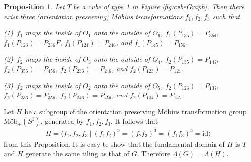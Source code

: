 \documentclass[suppldata, dvipdfmx]{interact}
\theoremstyle{plain}%
\newtheorem{proposition}[theorem]{Proposition}
\theoremstyle{definition}
\theoremstyle{remark}
\theoremstyle{problemstyle}
\begin{document}
\begin{proposition}
Let $T$ be a cube of type 1 in Figure \ref{fig:cubeGraph}. Then there exist three (orientation preserving) M\"obius transformations $f_1, f_2, f_3$ such that \par
(1)\ $f_1$ maps the inside of $O_1$ onto the outside of
     $O_6$, $f_1(P_{135}) = P_{356}$, $f_1(P_{123}) = P_{236}F$,  
$f_1(P_{124}) = P_{246}$, and $f_1(P_{145}) = P_{456}$.\par
(2)\ $f_2$ maps the inside of $O_3$ onto the outside of $O_4$, 
$f_2(P_{135}) = P_{145}$, $f_2(P_{356}) = P_{456}$,  
$f_2(P_{236}) = P_{246}$, and $f_2(P_{123}) = P_{124}$.      \par       
(3)\ $f_2$ maps the inside of $O_2$ onto the outside of $O_5$, 
$f_2(P_{123}) = P_{135}$, $f_2(P_{236}) = P_{356}$,  
$f_2(P_{246}) = P_{456}$, and $f_2(P_{124}) = P_{145}$.             
\end{proposition}

Let $H$ be a subgroup of the orientation preserving M\"obius transformation group M\"ob$_+(S^3)$, 
generated by $f_1, f_2, f_3$. It follows that
\begin{align*}
 H = \langle f_1, f_2, f_3~|~(f_1f_2)^3 = (f_2f_3)^3 = (f_1f_3)^3 = \text{id} \rangle
\end{align*}
from this Proposition.  It is easy to show that the fundamental domain of $H$ is $T$ and $H$ generate the same tiling as that of $G$.  Therefore $\Lambda(G)=\Lambda(H)$.
\end{document}
